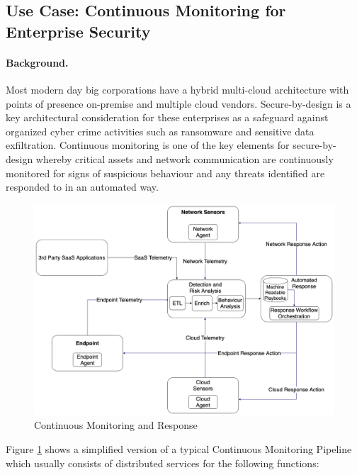 \subsection{Use Case: Continuous Monitoring for Enterprise Security}


\paragraph*{Background.}
Most modern day big corporations have a hybrid multi-cloud architecture 
with points of presence on-premise and multiple cloud vendors. 
Secure-by-design is a key architectural consideration for these 
enterprises as a safeguard against organized cyber crime activities 
such as ransomware and sensitive data exfiltration. Continuous monitoring 
is one of the key elements for secure-by-design whereby critical 
assets and network communication are continuously monitored for signs 
of suspicious behaviour and any threats identified are responded to in an automated way.

\begin{figure}[htb]
\centering\includegraphics[width=0.8\columnwidth]{usecase/security_usecase_analytics_as_a_service_framework.drawio.png}
\caption{Continuous Monitoring and Response}
\label{fig:sec-general}
\end{figure}

Figure \ref{fig:sec-general} shows a simplified version of a typical 
Continuous Monitoring Pipeline which usually consists of distributed services for the following functions:

